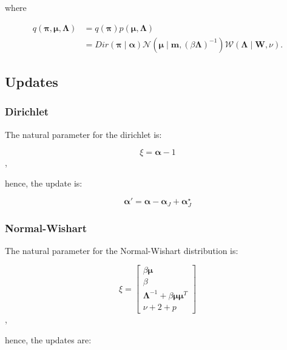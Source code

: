 \documentclass{article}
\begin{document}
where 

\begin{align}
q(\boldsymbol{\pi}, \boldsymbol{\mu}, \boldsymbol{\Lambda}) 
&= q(\boldsymbol{\pi})p(\boldsymbol{\mu}, \boldsymbol{\Lambda}) \\
&= Dir(\boldsymbol{\pi} \mid \boldsymbol{\alpha})
\mathcal{N}(\boldsymbol{\mu} \mid \mathbf{m}, (\beta\boldsymbol{\Lambda})^{-1})
\mathcal{W}(\boldsymbol{\Lambda} \mid \mathbf{W}, \nu).
\end{align}

\subsection{Updates}

\subsubsection{Dirichlet}

The natural parameter for the dirichlet is:

\begin{equation}
\xi = \boldsymbol{\alpha} - 1
\end{equation},

hence, the update is:

\begin{equation}
\boldsymbol{\alpha}' = \boldsymbol{\alpha} 
- \boldsymbol{\alpha}_J 
+ \boldsymbol{\alpha}_J^{\star}
\end{equation}

\subsubsection{Normal-Wishart}

The natural parameter for the Normal-Wishart distribution is:

\begin{equation}
\xi = \begin{bmatrix}
       \beta\boldsymbol{\mu}           \\[0.3em]
       \beta \\[0.3em]
       \boldsymbol{\Lambda}^{-1} + \beta\boldsymbol{\mu}\boldsymbol{\mu}^T \\[0.3em]
       \nu + 2 + p
     \end{bmatrix}
\end{equation},

hence, the updates are:
\end{document}
